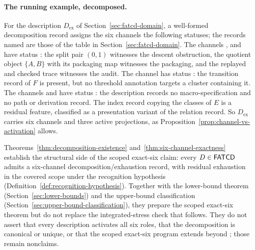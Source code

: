 \paragraph{The running example, decomposed.} For the description
\(D_{\mathrm{ex}}\) of Section~\ref{sec:fatcd-domain}, a well-formed
decomposition record assigns the six channels the following statuses; the
records named are those of the table in Section~\ref{sec:fatcd-domain}. The
channels \Pone{}, \Pfive{} and \Psix{} have status \activeproj{}: the split pair
\((0,1)\) witnesses the descent obstruction, the quotient object \(\{A,B\}\)
with its packaging map witnesses the packaging, and the replayed and checked
trace witnesses the audit. The channel \Pfour{} has status \belowthr{}: the
transition record of \(F\) is present, but no threshold annotation targets a
cluster containing it. The channels \Ptwo{} and \Pthree{} have status \absentrec{}: the
description records no macro-specification and no path or derivation record. The index
record copying the classes of \(E\) is a residual feature, classified as a
presentation variant of the relation record. So \(D_{\mathrm{ex}}\) carries six
channels and three active projections, as Proposition~\ref{prop:channel-vs-activation}
allows.

\begin{remark}\label{rem:dec-scope}
Theorems~\ref{thm:decomposition-existence}
and~\ref{thm:six-channel-exactness} establish the structural side of
the scoped exact-six claim: every \(D \in \mathsf{FATCD}{}\) admits a
six-channel decomposition/exhaustion record, with residual exhaustion in the
covered scope under the recognition hypothesis
(Definition~\ref{def:recognition-hypothesis}). Together with the lower-bound theorem
(Section~\ref{sec:lower-bounds}) and the upper-bound classification
(Section~\ref{sec:upper-bound-classification}), they prepare the
scoped exact-six theorem but do not replace the integrated-stress
check that follows. They do not assert that every description
activates all six roles, that the decomposition is canonical or
unique, or that the scoped exact-six program extends beyond \FATCD{};
those remain nonclaims.
\end{remark}


